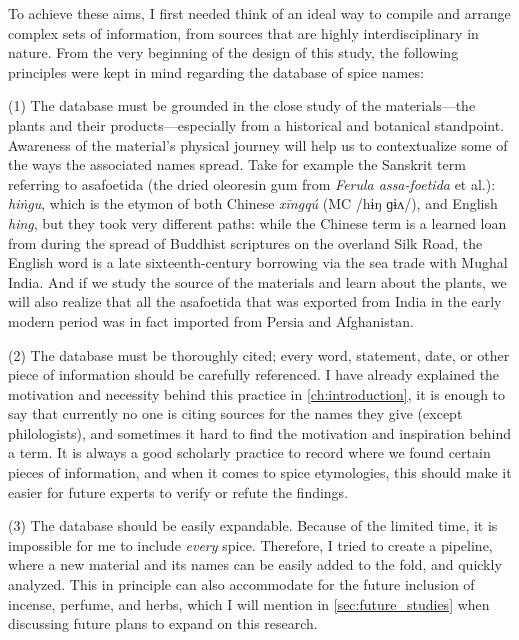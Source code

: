 To achieve these aims, I first needed think of an ideal way to compile and arrange complex sets of information, from sources that are highly interdisciplinary in nature. From the very beginning of the design of this study, the following principles were kept in mind regarding the database of spice names:

(1) The database must be grounded in the close study of the materials---the plants and their products---especially from a historical and botanical standpoint. Awareness of the material's physical journey will help us to contextualize some of the ways the associated names spread. Take for example the Sanskrit term referring to asafoetida (the dried oleoresin gum from \textit{Ferula assa-foetida} et al.):  \textit{hiṅgu}, which is the etymon of both Chinese  \textit{xīngqú} (\gls{MC} /hɨŋ ɡɨʌ/),
and English \textit{hing}, but they took very different paths: while the Chinese term is a learned loan from during the spread of Buddhist scriptures on the overland Silk Road, the English word is a late sixteenth-century borrowing via the sea trade with Mughal India. And if we study the source of the materials and learn about the plants, we will also realize that all the asafoetida that was exported from India in the early modern period was in fact imported from Persia and Afghanistan.

(2) The database must be thoroughly cited; every word, statement, date, or other piece of information should be carefully referenced. I have already explained the motivation and necessity behind this practice in \cref{ch:introduction}, it is enough to say that currently no one is citing sources for the names they give (except philologists), and sometimes it hard to find the motivation and inspiration behind a term. It is always a good scholarly practice to record where we found certain pieces of information, and when it comes to spice etymologies, this should make it easier for future experts to verify or refute the findings.

(3) The database should be easily expandable. Because of the limited time, it is impossible for me to include \emph{every} spice. Therefore, I tried to create a pipeline, where a new material and its names can be easily added to the fold, and quickly analyzed. This in principle can also accommodate for the future inclusion of incense, perfume, and herbs, which I will mention in \cref{sec:future_studies} when discussing future plans to expand on this research.


